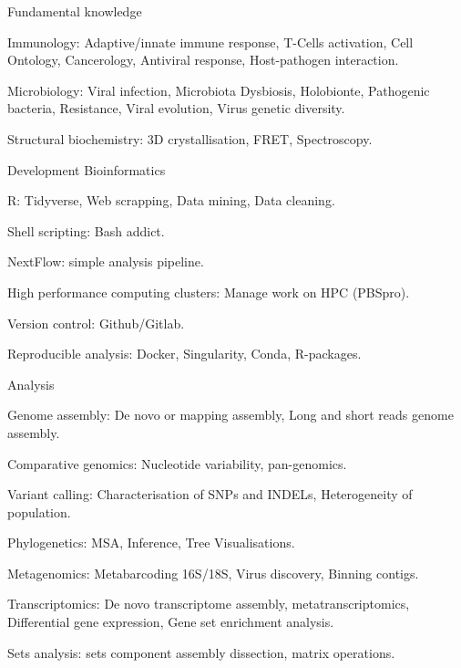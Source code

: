 \begin{cventries}
  \cventry
    {Fundamental knowledge} %
    {} %
    {} %
    {} %
    {
      \begin{cvitems} %
        \item {Immunology: Adaptive/innate immune response, T-Cells activation, Cell Ontology, Cancerology, Antiviral response, Host-pathogen interaction.}
        \item {Microbiology: Viral infection, Microbiota Dysbiosis, Holobionte, Pathogenic bacteria, Resistance, Viral evolution, Virus genetic diversity.}
        \item {Structural biochemistry: 3D crystallisation, FRET, Spectroscopy.}
      \end{cvitems}
    }

  \cventry
    {Development} %
    {Bioinformatics} %
    {} %
    {} %
    {
      \begin{cvitems} %
        \item {R: Tidyverse, Web scrapping, Data mining, Data cleaning.}
        \item {Shell scripting: Bash addict.}
        \item {NextFlow: simple analysis pipeline.}
        \item {High performance computing clusters: Manage work on HPC (PBSpro).}
        \item {Version control: Github/Gitlab.}
        \item {Reproducible analysis: Docker, Singularity, Conda, R-packages.}
      \end{cvitems}
    }

  \cventry
    {Analysis} %
    {} %
    {} %
    {} %
    {
      \begin{cvitems} %
        \item {Genome assembly: De novo or mapping assembly, Long and short reads genome assembly.}
        \item {Comparative genomics: Nucleotide variability, pan-genomics.}
        \item {Variant calling: Characterisation of SNPs and INDELs, Heterogeneity of population.}
        \item {Phylogenetics: MSA, Inference, Tree Visualisations.}
        \item {Metagenomics: Metabarcoding 16S/18S, Virus discovery, Binning contigs.}
        \item {Transcriptomics: De novo transcriptome assembly, metatranscriptomics, Differential gene expression, Gene set enrichment analysis.}
        \item {Sets analysis: sets component assembly dissection, matrix operations.}
      \end{cvitems}
    }


\end{cventries}